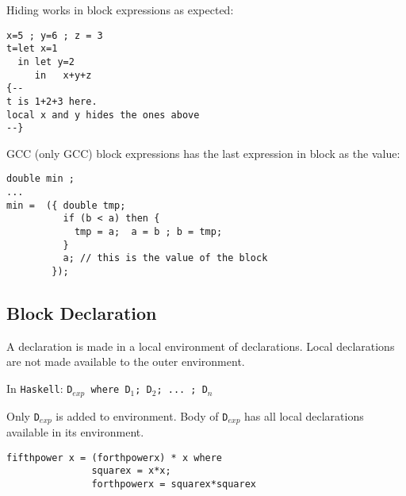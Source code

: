 \vspace*{\fill}
\columnbreak

\noindent Hiding works in block expressions as expected:
\begin{listing}[H]

\begin{verbatim}
x=5 ; y=6 ; z = 3
t=let x=1 
  in let y=2 
     in   x+y+z
{--
t is 1+2+3 here. 
local x and y hides the ones above
--}
\end{verbatim}
\caption{}
\label{code:code9}
\end{listing}

\noindent GCC (only GCC) block expressions has the last expression in block as the value:
\begin{listing}[H]

\begin{verbatim}
double min ;
...
min =  ({ double tmp;
          if (b < a) then {
            tmp = a;  a = b ; b = tmp;
          }
          a; // this is the value of the block
        });
\end{verbatim}
\caption{}
\label{code:code10}
\end{listing}

\subsection{Block Declaration}

A declaration is made in a local environment of declarations. Local declarations are not made available to the outer environment.

In \texttt{Haskell}: \texttt{D$_{exp}$ where D$_1$; D$_2$;  ... ; D$_n$}

\noindent Only \texttt{D$_{exp}$} is added to environment. Body of \texttt{D$_{exp}$} has all local declarations available in its environment.

\begin{listing}[H]

\begin{verbatim}
fifthpower x = (forthpowerx) * x where
               squarex = x*x;
               forthpowerx = squarex*squarex
\end{verbatim}
\caption{}
\label{code:code11}
\end{listing}



